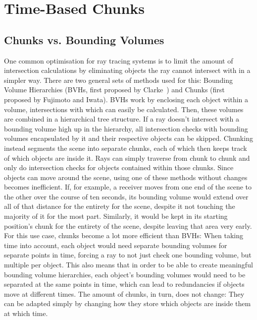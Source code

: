 \chapter{Time-Based Chunks}

\section{Chunks vs. Bounding Volumes}

One common optimisation for ray tracing systems is to limit the amount of intersection calculations by eliminating
objects the ray cannot intersect with in a simpler way.
There are two general sets of methods used for this:
Bounding Volume Hierarchies (BVHs, first proposed by Clarke~\cite{Cl76})
and Chunks (first proposed by Fujimoto and Iwata).
BVHs work by enclosing each object within a volume, intersections with which can easily be calculated.
Then, these volumes are combined in a hierarchical tree structure.
If a ray doesn't intersect with a bounding volume high up in the hierarchy,
all intersection checks with bounding volumes encapsulated by it and their respective objects can be skipped.
Chunking instead segments the scene into separate chunks, each of which then keeps track of which objects are inside it.
Rays can simply traverse from chunk to chunk and only do intersection checks for objects contained within those chunks.
\newline
Since objects can move around the scene, using one of these methods without changes becomes inefficient.
If, for example, a receiver moves from one end of the scene to the other over the course of ten seconds,
its bounding volume would extend over all of that distance for the entirety for the scene, despite it not touching
the majority of it for the most part. Similarly, it would be kept in its starting position's chunk for the entirety
of the scene, despite leaving that area very early.
\newline
For this use case, chunks become a lot more efficient than BVHs:
When taking time into account, each object would need separate bounding volumes for separate points in time,
forcing a ray to not just check one bounding volume, but multiple per object.
This also means that in order to be able to create meaningful bounding volume hierarchies,
each object's bounding volumes would need to be separated at the same points in time,
which can lead to redundancies if objects move at different times.
\newline
The amount of chunks, in turn, does not change:
They can be adapted simply by changing how they store which objects are inside them at which time.

